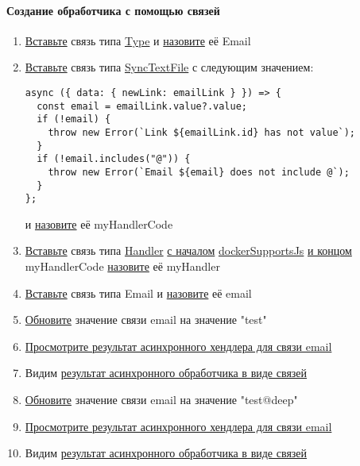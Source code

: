 \paragraph{Создание обработчика с помощью связей}
\begin{enumerate}
  \item \hyperlink{DeepCase.InsertLink.Description}{Вставьте} связь типа
        \hyperlink{Core.Type.Description}{Type} и
        \hyperlink{FAQ.HowToSetName}{назовите} её Email
  \item \hyperlink{DeepCase.InsertLink.Description}{Вставьте} связь типа
        \hyperlink{Core.SyncTextFile.Description}{SyncTextFile} с следующим
        значением:
        \begin{lstlisting}
async ({ data: { newLink: emailLink } }) => {
  const email = emailLink.value?.value;
  if (!email) {
    throw new Error(`Link ${emailLink.id} has not value`);
  }
  if (!email.includes("@")) {
    throw new Error(`Email ${email} does not include @`);
  }
};
            \end{lstlisting}
        и \hyperlink{FAQ.HowToSetName}{назовите} её myHandlerCode
  \item \hyperlink{DeepCase.InsertLink.Description}{Вставьте} связь типа
        \hyperlink{Core.Handler.Description}{Handler}
        \hyperlink{FAQ.HowToInsertLinkWithFromAndTo}{с началом}
        \hyperlink{Core.dockerSupportsJs.Description}{dockerSupportsJs}
        \hyperlink{FAQ.HowToInsertLinkWithFromAndTo}{и
          концом}
        myHandlerCode \hyperlink{FAQ.HowToSetName}{назовите} её myHandler
  \item \hyperlink{DeepCase.InsertLink.Description}{Вставьте} связь типа
        Email и \hyperlink{FAQ.HowToSetName}{назовите} её email
  \item \hyperlink{DeepCase.UpdateLink.Description}{Обновите} значение
        связи email на значение "test"
  \item \hyperlink{Handlers.Async.HowToGetResult}{Просмотрите результат
          асинхронного хендлера для связи email}
  \item Видим \hyperlink{Handlers.Async.Result}{результат асинхронного
          обработчика в виде связей}
  \item \hyperlink{DeepCase.UpdateLink.Description}{Обновите} значение
        связи email на значение "test@deep"
  \item \hyperlink{Handlers.Async.HowToGetResult}{Просмотрите результат
          асинхронного хендлера для связи email}
  \item Видим \hyperlink{Handlers.Async.Result}{результат асинхронного
          обработчика в виде связей}
\end{enumerate}

